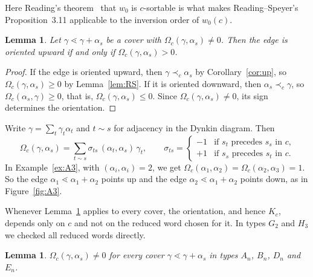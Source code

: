 \documentclass[11pt]{amsart}
\newtheorem{lemma}[theorem]{Lemma}
\theoremstyle{definition}
\newcommand{\pr}{\prec_c}
\begin{document}
Here Reading's theorem~\cite[Cor.~4.4]{Rea} that $w_0$ is $c$-sortable is what makes Reading--Speyer's Proposition~3.11 applicable to the inversion order of $w_0(c)$.

\begin{lemma}\label{lem:rule}
Let $\gamma\lessdot\gamma+\alpha_s$ be a cover with $\Omega_c(\gamma,\alpha_s)\neq0$. Then the edge is oriented upward if and only if $\Omega_c(\gamma,\alpha_s)>0$.
\end{lemma}

\begin{proof}
If the edge is oriented upward, then $\gamma\pr\alpha_s$ by Corollary~\ref{cor:up}, so $\Omega_c(\gamma,\alpha_s)\ge0$ by Lemma~\ref{lem:RS}. If it is oriented downward, then $\alpha_s\pr\gamma$, so $\Omega_c(\alpha_s,\gamma)\ge0$, that is, $\Omega_c(\gamma,\alpha_s)\le0$. Since $\Omega_c(\gamma,\alpha_s)\ne0$, its sign determines the orientation.
\end{proof}

Write $\gamma=\sum_t\gamma_t\alpha_t$ and $t\sim s$ for adjacency in the Dynkin diagram. Then
\begin{equation}\label{eq:omega}
\Omega_c(\gamma,\alpha_s)=\sum_{t\sim s}\sigma_{ts}\,(\alpha_t,\alpha_s)\,\gamma_t,\qquad \sigma_{ts}=\begin{cases}-1&\text{if $s_t$ precedes $s_s$ in $c$,}\\ +1&\text{if $s_s$ precedes $s_t$ in $c$.}\end{cases}
\end{equation}
In Example~\ref{ex:A3}, with $(\alpha_i,\alpha_i)=2$, we get $\Omega_c(\alpha_1,\alpha_2)=\Omega_c(\alpha_2,\alpha_3)=1$. So the edge $\alpha_1\lessdot\alpha_1+\alpha_2$ points up and the edge $\alpha_2\lessdot\alpha_1+\alpha_2$ points down, as in Figure~\ref{fig:A3}.

Whenever Lemma~\ref{lem:rule} applies to every cover, the orientation, and hence $K_c$, depends only on $c$ and not on the reduced word chosen for it. In types $G_2$ and $H_3$ we checked all reduced words directly.

\begin{lemma}\label{lem:nonzero}
$\Omega_c(\gamma,\alpha_s)\ne0$ for every cover $\gamma\lessdot\gamma+\alpha_s$ in types $A_n$, $B_n$, $D_n$ and $E_n$.
\end{lemma}
\end{document}
